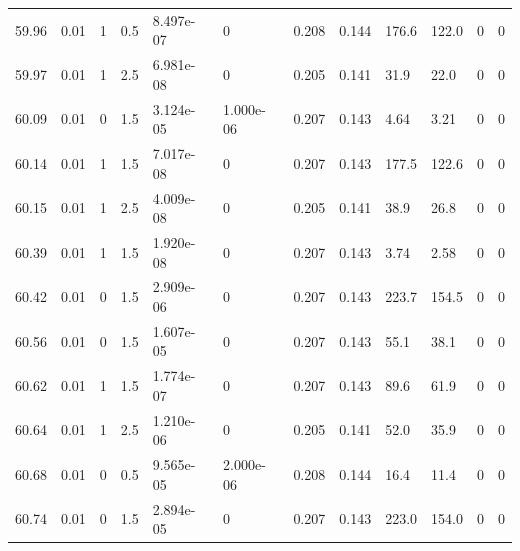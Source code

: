 \documentclass[preview]{standalone}
\begin{document}
{{{{{{{{{{{{{{{{{{{\begin{tabular}{L{1.2cm}C{1.2cm} C{0.3cm}C{0.5cm} C{1.4cm}C{1.4cm} C{1.4cm}C{1.4cm} C{1.6cm}C{1.6cm} C{1.6cm}C{1.6cm}}
  59.96  &  0.01  & 1     & 0.5 &  8.497e-07  & 0  &  0.208&   0.144& 176.6 & 122.0   &  0 & 0  \\ 
  59.97  &  0.01  & 1     & 2.5 &  6.981e-08  & 0  &  0.205&   0.141& 31.9 & 22.0   &  0 & 0  \\ 
  60.09  &  0.01  & 0     & 1.5 &  3.124e-05  & 1.000e-06  &  0.207&   0.143& 4.64 & 3.21   &  0 & 0  \\ 
  60.14  &  0.01  & 1     & 1.5 &  7.017e-08  & 0  &  0.207&   0.143& 177.5 & 122.6   &  0 & 0  \\ 
  60.15  &  0.01  & 1     & 2.5 &  4.009e-08  & 0  &  0.205&   0.141& 38.9 & 26.8   &  0 & 0  \\ 
  60.39  &  0.01  & 1     & 1.5 &  1.920e-08  & 0  &  0.207&   0.143& 3.74 & 2.58   &  0 & 0  \\ 
  60.42  &  0.01  & 0     & 1.5 &  2.909e-06  & 0  &  0.207&   0.143& 223.7 & 154.5   &  0 & 0  \\ 
  60.56  &  0.01  & 0     & 1.5 &  1.607e-05  & 0  &  0.207&   0.143& 55.1 & 38.1   &  0 & 0  \\ 
  60.62  &  0.01  & 1     & 1.5 &  1.774e-07  & 0  &  0.207&   0.143& 89.6 & 61.9   &  0 & 0  \\ 
  60.64  &  0.01  & 1     & 2.5 &  1.210e-06  & 0  &  0.205&   0.141& 52.0 & 35.9   &  0 & 0  \\ 
  60.68  &  0.01  & 0     & 0.5 &  9.565e-05  & 2.000e-06  &  0.208&   0.144& 16.4 & 11.4   &  0 & 0  \\ 
  60.74  &  0.01  & 0     & 1.5 &  2.894e-05  & 0  &  0.207&   0.143& 223.0 & 154.0   &  0 & 0  \\ 
\hline 
\end{tabular} 

}}}}}}}}}}}}}}}}}}}
\end{document}
